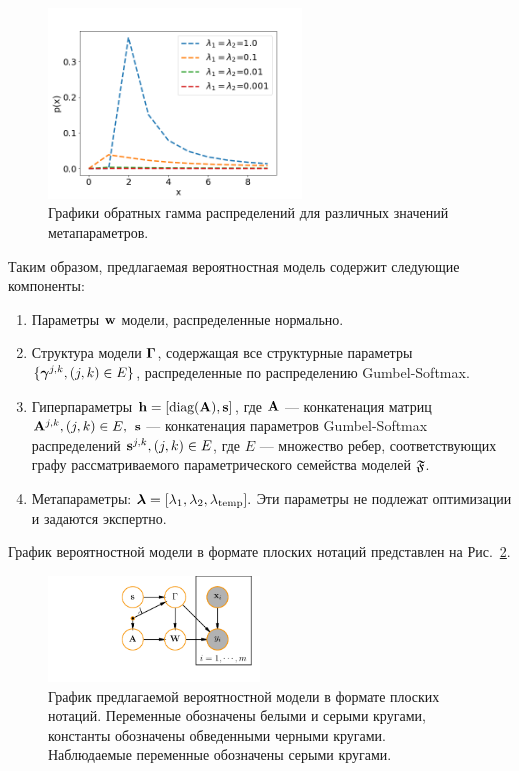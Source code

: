 \begin{figure}
\centering
\includegraphics[width=0.6\textwidth]{plots/notebooks/invgamma.png}
\caption{Графики обратных гамма распределений для различных значений метапараметров.}
\label{fig:inv-gamma}
\end{figure}


Таким образом, предлагаемая вероятностная модель содержит следующие компоненты:
\begin{enumerate}
\item Параметры $\mathbf{w}$ модели, распределенные нормально.
\item Структура модели $\boldsymbol{\Gamma}$, содержащая все структурные параметры $\{\boldsymbol{\gamma}^{j,k}, (j,k) \in E\}$, распределенные по распределению Gumbel-Softmax.
\item Гиперпараметры $\mathbf{h} = [\text{diag}(\mathbf{A}), \mathbf{s}]$, где $\mathbf{A}$ --- конкатенация матриц $\mathbf{A}^{j,k}, (j,k) \in E,$ $\mathbf{s}$ --- конкатенация параметров Gumbel-Softmax распределений $\mathbf{s}^{j,k}, (j,k) \in E$, где $E$ --- множество ребер, соответствующих графу рассматриваемого параметрического семейства моделей $\mathfrak{F}$.
\item Метапараметры: $\boldsymbol{\lambda} = [\lambda_1, \lambda_2, \lambda_{\text{temp}}].$ Эти параметры не подлежат оптимизации и задаются экспертно. 
\end{enumerate}

График вероятностной модели в формате плоских нотаций представлен на Рис.~\ref{fig:plate_prob}.
\begin{figure}
\centering
   \includegraphics[width=0.5\textwidth]{plots/notebooks/simple_plate.pdf}
\caption{График предлагаемой вероятностной модели в формате плоских нотаций. Переменные обозначены белыми и серыми кругами, константы обозначены обведенными черными кругами. Наблюдаемые переменные обозначены серыми кругами.}
\label{fig:plate_prob}
\end{figure}

